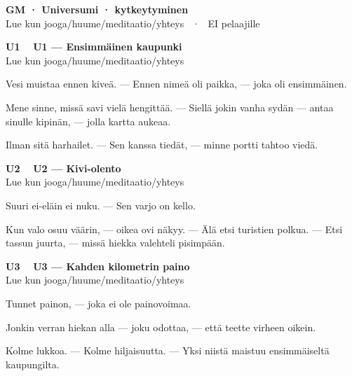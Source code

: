 \documentclass[a4paper,11pt]{article}
\begin{document}
\begin{center}
{\Large\bfseries GM · Universumi · kytkeytyminen}\\[0.1em]
{\small Lue kun jooga/huume/meditaatio/yhteys \ · \ EI pelaajille}
\end{center}
\vspace{0.8mm}

\noindent
\begin{tcolorbox}[
  colframe=unicol,
  colback=white,
  boxrule=0.8pt,
  arc=0pt,
  outer arc=0pt,
  left=2.5mm, right=2.5mm, top=2mm, bottom=2mm,
  boxsep=0.5mm,
  sharp corners,
  enhanced,
  breakable=false
]
{\large\ttfamily\bfseries U1}~~
{\normalsize\bfseries U1 --- Ensimmäinen kaupunki}\\[0.2em]
{\small\color{black!65} Lue kun jooga/huume/meditaatio/yhteys}\\[0.35em]
{\normalsize\raggedright Vesi muistaa ennen kiveä. --- Ennen nimeä oli paikka, --- joka oli ensimmäinen.

Mene sinne, missä savi vielä hengittää. --- Siellä jokin vanha sydän --- antaa sinulle kipinän, --- jolla kartta aukeaa.

Ilman sitä harhailet. --- Sen kanssa tiedät, --- minne portti tahtoo viedä.}
\end{tcolorbox}

\filbreak
\vspace{0.9mm}
\noindent
\begin{tcolorbox}[
  colframe=unicol,
  colback=white,
  boxrule=0.8pt,
  arc=0pt,
  outer arc=0pt,
  left=2.5mm, right=2.5mm, top=2mm, bottom=2mm,
  boxsep=0.5mm,
  sharp corners,
  enhanced,
  breakable=false
]
{\large\ttfamily\bfseries U2}~~
{\normalsize\bfseries U2 --- Kivi-olento}\\[0.2em]
{\small\color{black!65} Lue kun jooga/huume/meditaatio/yhteys}\\[0.35em]
{\normalsize\raggedright Suuri ei-eläin ei nuku. --- Sen varjo on kello.

Kun valo osuu väärin, --- oikea ovi näkyy. --- Älä etsi turistien polkua. --- Etsi tassun juurta, --- missä hiekka valehteli pisimpään.}
\end{tcolorbox}

\filbreak
\vspace{0.9mm}
\noindent
\begin{tcolorbox}[
  colframe=unicol,
  colback=white,
  boxrule=0.8pt,
  arc=0pt,
  outer arc=0pt,
  left=2.5mm, right=2.5mm, top=2mm, bottom=2mm,
  boxsep=0.5mm,
  sharp corners,
  enhanced,
  breakable=false
]
{\large\ttfamily\bfseries U3}~~
{\normalsize\bfseries U3 --- Kahden kilometrin paino}\\[0.2em]
{\small\color{black!65} Lue kun jooga/huume/meditaatio/yhteys}\\[0.35em]
{\normalsize\raggedright Tunnet painon, --- joka ei ole painovoimaa.

Jonkin verran hiekan alla --- joku odottaa, --- että teette virheen oikein.

Kolme lukkoa. --- Kolme hiljaisuutta. --- Yksi niistä maistuu ensimmäiseltä kaupungilta.}
\end{tcolorbox}
\end{document}
